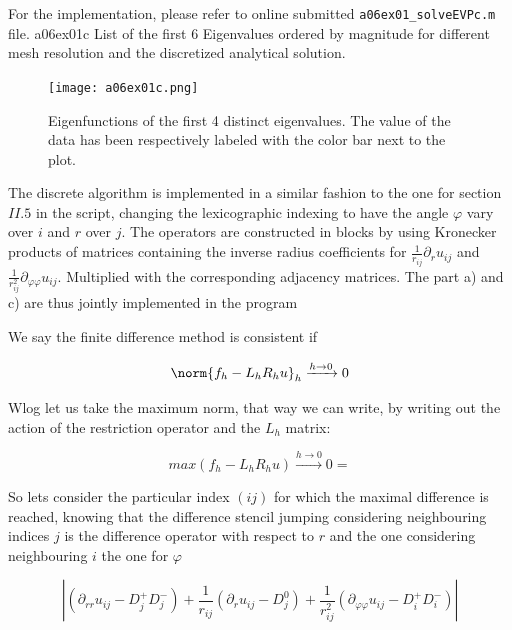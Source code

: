 For the implementation, please refer to online submitted \texttt{a06ex01\_solveEVPc.m} file.
%
\vspace*{2\FigUpperVSpace}
		 {a06ex01c}
		 {List of the first 6 Eigenvalues ordered by magnitude for different mesh resolution and the discretized analytical solution.}
%
\begin{figure}[H]
	\centering
	\texttt{[image: a06ex01c.png]} 
	\caption{Eigenfunctions of the first 4 distinct eigenvalues.
			 The value of the data has been respectively labeled with the color bar next to the plot.}
	\label{fig:a06ex01c}
\end{figure}
%

The discrete algorithm is implemented in a similar fashion to the one for section $II.5$ in the script, changing the lexicographic indexing to have the angle $\varphi$ vary over $i$ and $r$ over $j$. The operators are constructed in blocks by using Kronecker products of matrices containing the inverse radius coefficients for $\frac{1}{r_{ij}}\partial_{r}u_{ij}$ and $\frac{1}{r_{ij}^2}\partial_{\varphi\varphi}u_{ij}$. Multiplied with the corresponding adjacency matrices. The part a) and c) are thus jointly implemented in the program 

%
We say the finite difference method is consistent if

\begin{equation*}
    \norm{f_h-L_h R_h u}_h \xrightarrow{ h \to 0} 0
\end{equation*}

Wlog let us take the maximum norm, that way we can write, by writing out the action of the restriction operator and the $L_h$ matrix:

\begin{equation*}
    max(f_h-L_hR_hu) \xrightarrow{ h \to 0} 0=
\end{equation*}

So lets consider the particular index $(ij)$ for which the maximal difference is reached, knowing that the difference stencil jumping considering neighbouring indices $j$ is the difference operator with respect to $r$ and the one considering neighbouring $i$ the one for $\varphi$

\begin{equation*}
    |(\partial_{rr}u_{ij}-D^{+}_jD^{-}_j)
    +\frac{1}{r_{ij}}(\partial_{r}u_{ij}-D^{0}_j)
    +\frac{1}{r_{ij}^2}(\partial_{\varphi\varphi}u_{ij}-D^{+}_iD^{-}_i)|
\end{equation*}

